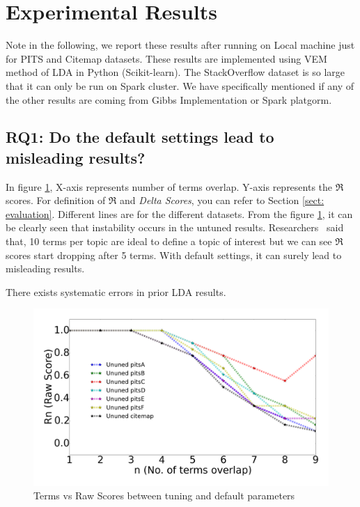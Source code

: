 \documentclass[10pt,conference]{IEEEtran}
\theoremstyle{break}
\begin{document}
\section{Experimental Results}

Note in the following, we report these results after running on Local machine just for PITS and Citemap datasets. These results are implemented using VEM method of LDA in Python (Scikit-learn). The StackOverflow dataset is so large that it can only be run on Spark cluster. We have specifically mentioned if any of the other results are coming from Gibbs Implementation or Spark platgorm.

\subsection{\textbf{RQ1: Do the default settings lead to misleading results?}}

In figure \ref{fig:raw_untuned}, X-axis represents number of terms overlap. Y-axis represents the $\Re$ scores. For definition of $\Re$ and \textit{Delta Scores}, you can refer to Section \ref{sect: evaluation}. Different lines are for the different datasets. From the figure \ref{fig:raw_untuned}, it can be clearly seen that instability occurs in the untuned results. Researchers~\cite{panichella2013effectively, lukins2010bug} said that, 10 terms per topic are ideal to define a topic of interest but we can see $\Re$ scores start dropping after 5 terms. With default settings, it can surely lead to misleading results.

\begin{lesson}
There exists systematic errors in prior LDA results.
\end{lesson}


\begin{figure}[!htbp]
  \centering
  \includegraphics[width=\linewidth]{./fig/Vem_untuned.png}
  \caption{Terms vs Raw Scores between tuning and default parameters}
  \label{fig:raw_untuned}
\end{figure}
\end{document}

